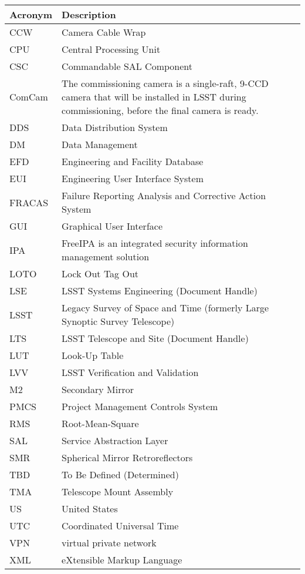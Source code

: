 \addtocounter{table}{-1}
\begin{longtable}{p{}p{}}\hline
\textbf{Acronym} & \textbf{Description}  \\\hline

CCW & Camera Cable Wrap \\\hline
CPU & Central Processing Unit \\\hline
CSC & Commandable SAL Component \\\hline
ComCam & The commissioning camera is a single-raft, 9-CCD camera that will be installed in LSST during commissioning, before the final camera is ready. \\\hline
DDS & Data Distribution System \\\hline
DM & Data Management \\\hline
EFD & Engineering and Facility Database \\\hline
EUI & Engineering User Interface System \\\hline
FRACAS & Failure Reporting Analysis and Corrective Action System \\\hline
GUI & Graphical User Interface \\\hline
IPA & FreeIPA is an integrated security information management solution \\\hline
LOTO & Lock Out Tag Out \\\hline
LSE & LSST Systems Engineering (Document Handle) \\\hline
LSST & Legacy Survey of Space and Time (formerly Large Synoptic Survey Telescope) \\\hline
LTS & LSST Telescope and Site (Document Handle) \\\hline
LUT & Look-Up Table \\\hline
LVV & LSST Verification and Validation \\\hline
M2 & Secondary Mirror \\\hline
PMCS & Project Management Controls System \\\hline
RMS & Root-Mean-Square \\\hline
SAL & Service Abstraction Layer \\\hline
SMR & Spherical Mirror Retroreflectors \\\hline
TBD & To Be Defined (Determined) \\\hline
TMA & Telescope Mount Assembly \\\hline
US & United States \\\hline
UTC & Coordinated Universal Time \\\hline
VPN & virtual private network \\\hline
XML & eXtensible Markup Language \\\hline
\end{longtable}
